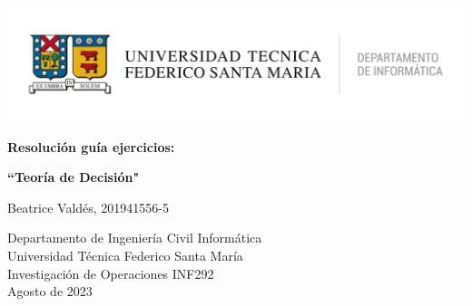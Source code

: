 \documentclass[11pt,letterpaper]{article}
\begin{document}
\renewcommand{\listtablename}{Índice de tablas} 
\renewcommand{\tablename}{Tabla} 

\begin{titlepage}
   \begin{center}
       \includegraphics[width=400pt]{Departamento-de-Informtica_HORIZONTAL.png}
       \vspace*{3cm}
        
       \textbf{\LARGE Resolución guía ejercicios:}

       \vspace{0.5cm}
        \Large \textbf{``Teoría de Decisión"}
            
       \vspace{2.5cm}

       \large Beatrice Valdés, 201941556-5

       \vfill
            
       \vspace{0.8cm}
     
       Departamento de Ingeniería Civil Informática\\
       Universidad Técnica Federico Santa María\\
       Investigación de Operaciones INF292\\
       Agosto de 2023
            
   \end{center}
\end{titlepage}
\end{document}
